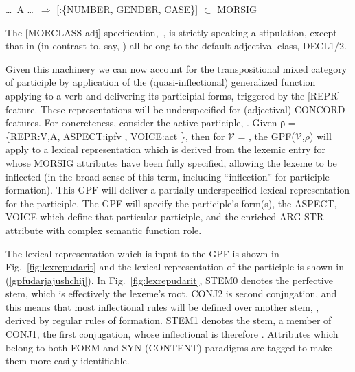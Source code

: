 \documentclass[output=paper,
modfonts
]{LSP/langsci}
\begin{document}
\begin{exe}	\ex	\label{adjmorsig}

\ldots\ A \ldots\  $\Rightarrow$  [:\{NUMBER, GENDER, CASE\}] $\subset$ MORSIG
\end{exe}

The [MORCLASS adj] specification, \,, is strictly speaking a stipulation, except that in  (in contrast to, say, ) all  belong to the default adjectival class, DECL1/2. %


Given this machinery we can now account for the transpositional mixed category of participle by application of the (quasi-inflectional) generalized  function applying to a verb and delivering its participial forms, triggered by the [REPR] feature. These representations will be underspecified for (adjectival) CONCORD features.  For concreteness, consider the  active participle, . Given ρ = \{REPR:\lab V,A\rab, ASPECT:ipfv\,\,, VOICE:act\,\,\}, then for $\mathcal{V}$ = , the GPF(\lab$\mathcal{V}$,$\rho$\rab) will apply to %
a lexical representation which is derived from the lexemic entry for  %
whose MORSIG attributes have been fully specified, allowing the lexeme to be inflected (in the broad sense of this term, including ``inflection'' for participle formation).
This GPF will deliver a partially underspecified lexical representation for the participle. The GPF will specify the participle’s  form(s), the ASPECT, VOICE  which define that particular participle, and the enriched ARG-STR attribute with complex semantic function role. %

The lexical representation which is input to the GPF is shown in Fig.~\ref{fig:lexrepudarit} and the lexical representation of the participle is shown in (\ref{gpfudarjajushchij}). %
In Fig.~\ref{fig:lexrepudarit},  STEM0 denotes the perfective stem, which is effectively the lexeme’s root. CONJ2 is second conjugation, and %
this means that most inflectional rules will be defined over another stem, , derived by regular rules of  formation. %
STEM1 denotes the  stem, a member of CONJ1, the first conjugation, whose inflectional  is therefore .  Attributes which belong to both FORM and SYN (CONTENT) paradigms are tagged to make them more easily identifiable.%
\end{document}
